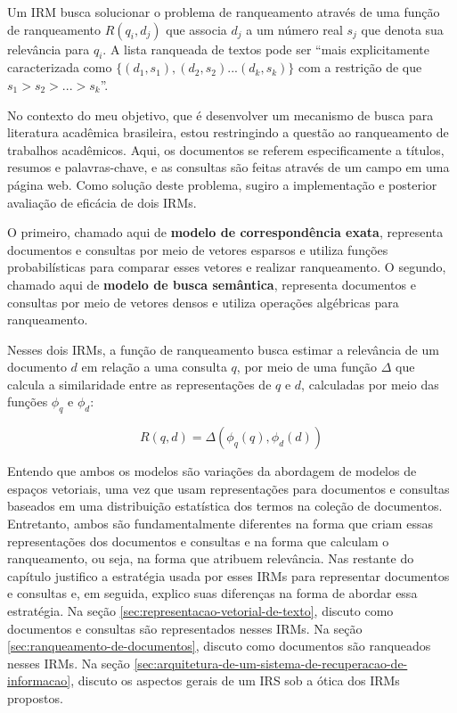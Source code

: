 \documentclass[
	12pt,				%
	openright,			%
	oneside,			%
	a4paper,			%
	english,			%
	french,				%
	spanish,			%
	brazil				%
	]{abntex2}
\begin{document}
Um IRM busca solucionar o problema de ranqueamento através de uma função de ranqueamento \(R(q_i, d_j)\) que associa \(d_j\) a um número real $s_j$ que denota sua relevância para \(q_i\).
A lista ranqueada de textos pode ser ``mais explicitamente caracterizada como $\{(d_1, s_1), (d_2, s_2) ... (d_k, s_k)\}$ com a restrição de que $s_1 > s_2 > ... > s_k$''. \cite{}

No contexto do meu objetivo, que é desenvolver um mecanismo de busca para literatura acadêmica brasileira, estou restringindo a questão ao ranqueamento de trabalhos acadêmicos. Aqui, os documentos se referem especificamente a títulos, resumos e palavras-chave, e as consultas são feitas através de um campo em uma página web.
Como solução deste problema, sugiro a implementação e posterior avaliação de eficácia de dois IRMs.

O primeiro, chamado aqui de \textbf{modelo de correspondência exata}, representa documentos e consultas por meio de vetores esparsos e utiliza funções probabilísticas para comparar esses vetores e realizar ranqueamento. O segundo, chamado aqui de \textbf{modelo de busca semântica}, representa documentos e consultas por meio de vetores densos e utiliza operações algébricas para ranqueamento.

Nesses dois IRMs, a função de ranqueamento busca estimar a relevância de um documento $d$ em relação a uma consulta $q$, por meio de uma função $\Delta$ que calcula a similaridade entre as representações de $q$ e $d$, calculadas por meio das funções $\phi_q$ e $\phi_d$:

\begin{equation}\label{eq:irm-rank}
    R(q, d) = \Delta(\phi_q(q), \phi_d(d))
\end{equation}

Entendo que ambos os modelos são variações da abordagem de modelos de espaços vetoriais, uma vez que
usam representações para documentos e consultas baseados em uma distribuição estatística dos termos na coleção de documentos.
Entretanto, ambos são fundamentalmente diferentes na forma que criam essas representações dos documentos e consultas e na forma que calculam o ranqueamento, ou seja, na forma que atribuem relevância.
Nas restante do capítulo justifico a estratégia usada por esses IRMs para representar documentos e consultas e, em seguida, explico suas diferenças na forma de abordar essa estratégia.
Na seção \ref{sec:representacao-vetorial-de-texto}, discuto como documentos e consultas são representados nesses IRMs.
Na seção \ref{sec:ranqueamento-de-documentos}, discuto como documentos são ranqueados nesses IRMs.
Na seção \ref{sec:arquitetura-de-um-sistema-de-recuperacao-de-informacao}, discuto os aspectos gerais de um IRS sob a ótica dos IRMs propostos.
\end{document}

